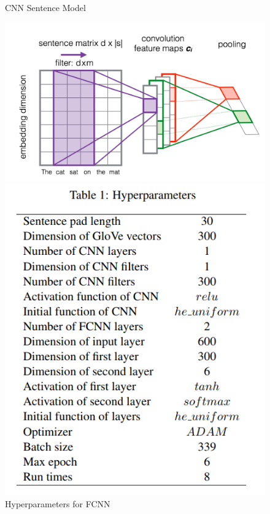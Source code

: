 \documentclass[12pt]{report} %
\begin{document}
	\begin{figure}[!tbp]
		\centering
		\begin{minipage}[b]{0.43\textwidth}
		\centering
		\label{CNN_1}
		\caption{CNN Sentence Model \cite{severyn2015learning}}
		\includegraphics[scale=0.20]{image/CNN_sentModel.png}
		\end{minipage}
		\hfill
		\begin{minipage}[b]{0.40\textwidth}
		\centering
		\caption{Hyperparameters for FCNN \cite{shao2017hcti}}
		\label{params}
		\includegraphics[scale=0.30]{image/hyperparameters.png}
		
		\end{minipage}
	\end{figure}
	
\end{document}
